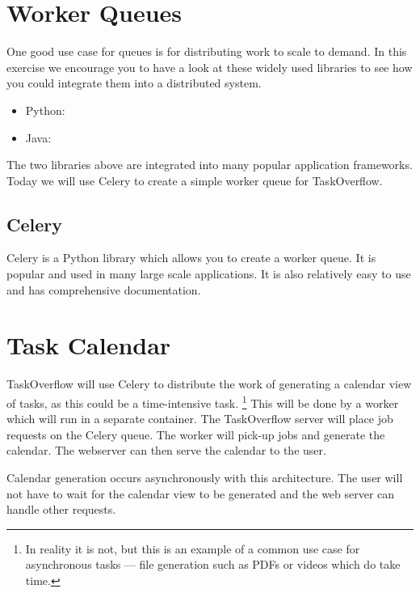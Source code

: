 \documentclass{csse4400}
\begin{document}


\section{Worker Queues}

One good use case for queues is for distributing work to scale to demand.
In this exercise we encourage you to have a look at these widely used libraries
to see how you could integrate them into a distributed system.

\begin{itemize}
  \item Python: 
  \item Java: 
\end{itemize}

The two libraries above are integrated into many popular application frameworks.
Today we will use Celery to create a simple worker queue for TaskOverflow.

\subsection{Celery}

Celery is a Python library which allows you to create a worker queue.
It is popular and used in many large scale applications.
It is also relatively easy to use and has comprehensive documentation.


\section{Task Calendar}

TaskOverflow will use Celery to distribute the work of generating a calendar view of tasks,
as this could be a time-intensive task.%
\footnote{In reality it is not, but this is an example of a common use case for asynchronous tasks
          --- file generation such as PDFs or videos which do take time.}
This will be done by a worker which will run in a separate container.
The TaskOverflow server will place job requests on the Celery queue.
The worker will pick-up jobs and generate the calendar.
The webserver can then serve the calendar to the user.

Calendar generation occurs asynchronously with this architecture.
The user will not have to wait for the calendar view to be generated and the web server can handle other requests.
\end{document}
